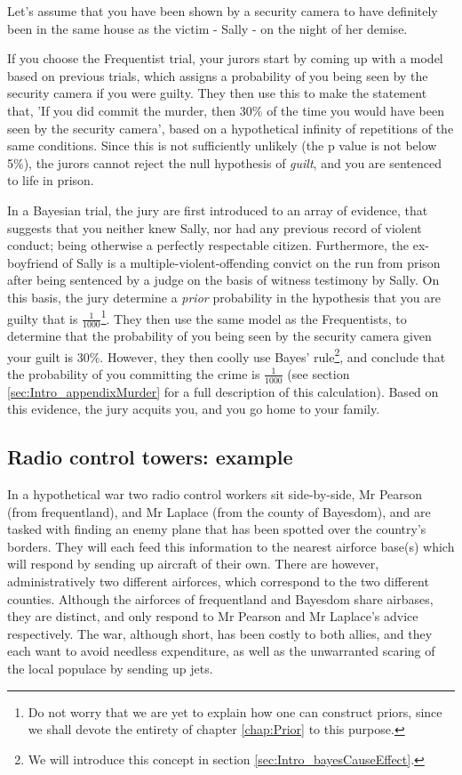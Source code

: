 \documentclass[11pt,fullpage]{book}
\begin{document}
Let's assume that you have been shown by a security camera to have definitely been in the same house as the victim - Sally - on the night of her demise. 

If you choose the Frequentist trial, your jurors start by coming up with a model based on previous trials, which assigns a probability of you being seen by the security camera if you were guilty. They then use this to make the statement that, 'If you did commit the murder, then 30\% of the time you would have been seen by the security camera', based on a hypothetical infinity of repetitions of the same conditions. Since this is not sufficiently unlikely (the p value is not below 5\%), the jurors cannot reject the null hypothesis of \textit{guilt}, and you are sentenced to life in prison.

In a Bayesian trial, the jury are first introduced to an array of evidence, that suggests that you neither knew Sally, nor had any previous record of violent conduct; being otherwise a perfectly respectable citizen. Furthermore, the ex-boyfriend of Sally is a multiple-violent-offending convict on the run from prison after being sentenced by a judge on the basis of witness testimony by Sally. On this basis, the jury determine a \textit{prior} probability in the hypothesis that you are guilty that is $\frac{1}{1000}$\footnote{Do not worry that we are yet to explain how one can construct priors, since we shall devote the entirety of chapter \ref{chap:Prior} to this purpose.}. They then use the same model as the Frequentists, to determine that the probability of you being seen by the security camera given your guilt is 30\%. However, they then coolly use Bayes' rule\footnote{We will introduce this concept in section \ref{sec:Intro_bayesCauseEffect}.}, and conclude that the probability of you committing the crime is $\frac{1}{1000}$ (see section \ref{sec:Intro_appendixMurder} for a full description of this calculation). Based on this evidence, the jury acquits you, and you go home to your family.

\subsection{Radio control towers: example}
In a hypothetical war two radio control workers sit side-by-side, Mr Pearson (from frequentland), and Mr Laplace (from the county of Bayesdom), and are tasked with finding an enemy plane that has been spotted over the country's borders. They will each feed this information to the nearest airforce base(s) which will respond by sending up aircraft of their own. There are however, administratively two different airforces, which correspond to the two different counties. Although the airforces of frequentland and Bayesdom share airbases, they are distinct, and only respond to Mr Pearson and Mr Laplace's advice respectively. The war, although short, has been costly to both allies, and they each want to avoid needless expenditure, as well as the unwarranted scaring of the local populace by sending up jets.
\end{document}
